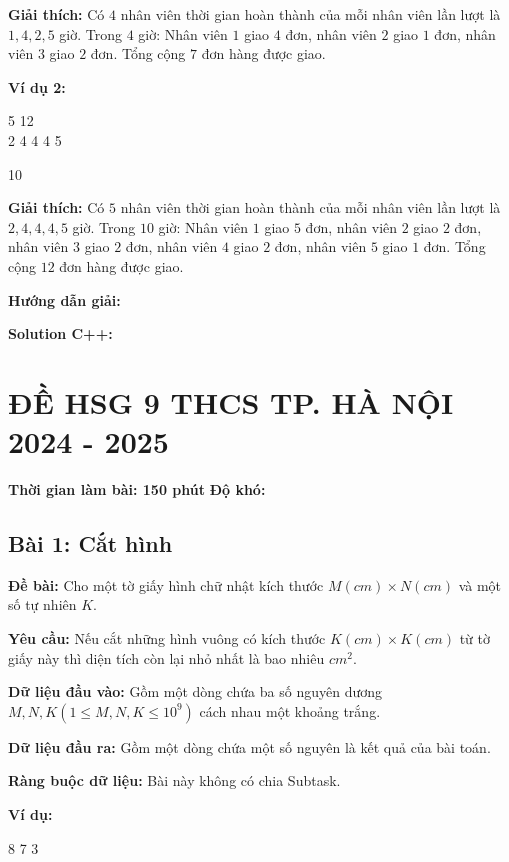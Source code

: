 \documentclass[12pt]{scrartcl}  %
\begin{document}
\textbf{Giải thích:}
Có $4$ nhân viên thời gian hoàn thành của mỗi nhân viên lần lượt là $1, 4, 2, 5$ giờ. Trong $4$ giờ: Nhân viên $1$ giao $4$ đơn, nhân viên $2$ giao $1$ đơn, nhân viên $3$ giao $2$ đơn. Tổng cộng $7$ đơn hàng được giao.

\textbf{Ví dụ 2:}
\begin{tcolorbox}[colback=gray!5!white, colframe=blue!50!black, title=Input]
5 12\\
2 4 4 4 5
\end{tcolorbox}

\begin{tcolorbox}[colback=gray!5!white, colframe=green!50!black, title=Output]
10
\end{tcolorbox}

\textbf{Giải thích:}
Có $5$ nhân viên thời gian hoàn thành của mỗi nhân viên lần lượt là $2, 4, 4, 4, 5$ giờ. Trong $10$ giờ: Nhân viên $1$ giao $5$ đơn, nhân viên $2$ giao $2$ đơn, nhân viên $3$ giao $2$ đơn, nhân viên $4$ giao $2$ đơn, nhân viên $5$ giao $1$ đơn. Tổng cộng $12$ đơn hàng được giao.

\textbf{Hướng dẫn giải:}

\textbf{Solution C++:}

\section{ĐỀ HSG 9 THCS TP. HÀ NỘI 2024 - 2025}
\textbf{Thời gian làm bài: 150 phút}
\textbf{Độ khó: }

\subsection{Bài 1: Cắt hình}
\textbf{Đề bài:}
Cho một tờ giấy hình chữ nhật kích thước $M (cm) \times N (cm)$ và một số tự nhiên $K$.

\textbf{Yêu cầu:}
Nếu cắt những hình vuông có kích thước $K (cm) \times K (cm)$ từ tờ giấy này thì diện tích còn lại nhỏ nhất là bao nhiêu $cm^2$. 

\textbf{Dữ liệu đầu vào:}
Gồm một dòng chứa ba số nguyên dương $M, N, K (1 \leq M, N, K \leq 10^9)$ cách nhau một khoảng trắng.

\textbf{Dữ liệu đầu ra:}
Gồm một dòng chứa một số nguyên là kết quả của bài toán.

\textbf{Ràng buộc dữ liệu:}
Bài này không có chia Subtask.

\textbf{Ví dụ:}
\begin{tcolorbox}[colback=gray!5!white, colframe=blue!50!black, title=Input]
8 7 3
\end{tcolorbox}
\end{document}
